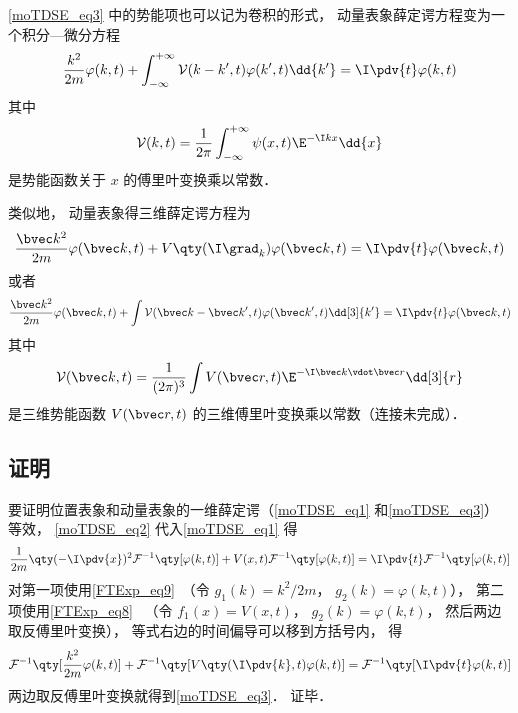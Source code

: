 \autoref{moTDSE_eq3} 中的势能项也可以记为卷积的形式， 动量表象薛定谔方程变为一个积分—微分方程
\begin{equation}\label{moTDSE_eq4}
\frac{k^2}{2m}\varphi(k, t) + \int_{-\infty}^{+\infty} \mathcal{V}(k-k', t) \varphi(k', t) \dd{k'} = \I \pdv{t} \varphi(k,t)
\end{equation}
其中
\begin{equation}
\mathcal{V}(k, t) = \frac{1}{2\pi}\int_{-\infty}^{+\infty} \psi(x,t)\E^{-\I kx}\dd{x}
\end{equation}
是势能函数关于 $x$ 的傅里叶变换乘以常数．

类似地， 动量表象得三维薛定谔方程为
\begin{equation}
\frac{\bvec k^2}{2m}\varphi(\bvec k, t) + V\qty(\I \grad_k)\varphi(\bvec k, t) = \I \pdv{t} \varphi(\bvec k,t)
\end{equation}
或者
\begin{equation}
\frac{\bvec k^2}{2m}\varphi(\bvec k, t) + \int \mathcal{V}(\bvec k-\bvec k', t) \varphi(\bvec k', t)\dd[3]{k'} = \I \pdv{t} \varphi(\bvec k,t)
\end{equation}
其中
\begin{equation}
\mathcal{V}(\bvec k, t) = \frac{1}{(2\pi)^{3}} \int V(\bvec r, t) \E^{-\I \bvec k \vdot \bvec r}\dd[3]{r}
\end{equation}
是三维势能函数 $V(\bvec r, t)$ 的三维傅里叶变换乘以常数（连接未完成）．

\subsection{证明}
要证明位置表象和动量表象的一维薛定谔（\autoref{moTDSE_eq1} 和\autoref{moTDSE_eq3}）等效， \autoref{moTDSE_eq2} 代入\autoref{moTDSE_eq1} 得
\begin{equation}\label{moTDSE_eq5}
\frac{1}{2m}\qty(-\I\pdv{x})^2 \mathcal{F}^{-1}\qty[\varphi(k, t)] + V(x, t)\mathcal{F}^{-1}\qty[\varphi(k, t)] = \I \pdv{t}\mathcal{F}^{-1}\qty[\varphi(k, t)]
\end{equation}
对第一项使用\autoref{FTExp_eq9}~（令 $g_1(k) = k^2/2m$， $g_2(k) = \varphi(k, t)$）， 第二项使用\autoref{FTExp_eq8}~ （令 $f_1(x) = V(x, t)$， $g_2(k) = \varphi(k, t)$， 然后两边取反傅里叶变换）， 等式右边的时间偏导可以移到方括号内， 得
\begin{equation}
\mathcal{F}^{-1}\qty[\frac{k^2}{2m}\varphi(k,t)] + \mathcal{F}^{-1}\qty[V\qty(\I \pdv{k}, t)\varphi(k,t)] = \mathcal{F}^{-1}\qty[\I \pdv{t}\varphi(k,t)]
\end{equation}
两边取反傅里叶变换就得到\autoref{moTDSE_eq3}． 证毕．

